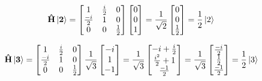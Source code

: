 \documentclass[norsk,a4paper,12pt]{article}
\begin{document}
	\begin{equation*}
	\begin{aligned}
	\mathbf{\hat{H}\ket{2}} = \begin{bmatrix}
	1 & \frac{i}{2} & 0 \\
	\frac{-i}{2} & 1 & 0 \\
	0 & 0 & \frac{1}{2} \\
	\end{bmatrix} \begin{bmatrix}
	0 \\
	0 \\
	1 \\
	\end{bmatrix} = \frac{1}{\sqrt{2}} \begin{bmatrix}
	0\\
	0 \\
	\frac{1}{2} \\
	\end{bmatrix} =  \frac{1}{2} \ket{2}
	\end{aligned}
	\end{equation*}
	
	\begin{equation*}
	\begin{aligned}
	\mathbf{\hat{H}\ket{3}} = \begin{bmatrix}
	1 & \frac{i}{2} & 0 \\
	\frac{-i}{2} & 1 & 0 \\
	0 & 0 & \frac{1}{2} \\
	\end{bmatrix} \frac{1}{\sqrt{3}} \begin{bmatrix}
	-i \\
	1 \\
	-1 \\
	\end{bmatrix} = \frac{1}{\sqrt{3}} \begin{bmatrix}
	-i + \frac{i}{2} \\
	\frac{i^2}{2} + 1 \\
	\frac{-1}{2} \\
	\end{bmatrix} = \frac{1}{\sqrt{3}} \begin{bmatrix}
	\frac{-i}{2}\\
	\frac{1}{2} \\
	\frac{-1}{2} \\
	\end{bmatrix} = \frac{1}{2} \ket{3}
	\end{aligned}
	\end{equation*}
\end{document}
